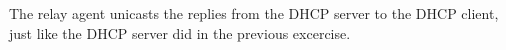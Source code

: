 The relay agent unicasts the replies from the DHCP server to the DHCP client, just like the DHCP server did in the previous excercise. \\
